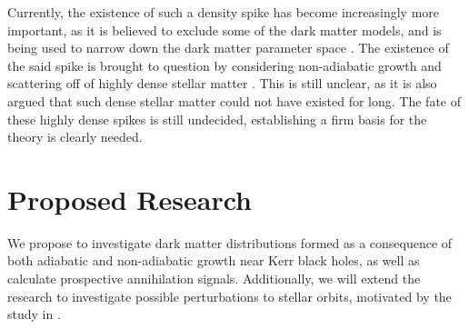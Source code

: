 \documentclass[12pt]{article}
\begin{document}


Currently, the existence of such a density spike has become 
increasingly more important, as it  
is believed to exclude some of the dark matter models, and is 
being used to narrow down the dark matter parameter space \citep{gondolo2000dmsearch,bertone2001dmsearch,fields2014galactic}. 
The existence of the said spike is brought to question by 
considering non-adiabatic growth and scattering off of highly dense 
stellar matter \citep{ullio2001spike_criticism, merritt2002merger_criticism}. 
This is still unclear, as it is also 
argued that such dense stellar matter could not have existed 
for long. %
The 
fate of these highly dense spikes is still undecided, establishing a firm basis for the 
theory is clearly needed.

\section{Proposed Research}


We propose to investigate dark matter distributions formed 
as a consequence of both adiabatic and non-adiabatic growth near Kerr black holes, 
as well as calculate prospective annihilation signals. 
Additionally, we will extend the research to investigate possible perturbations to 
stellar orbits, motivated by the study in \citep{Sadeghian_Ferrer_Will_2013}. 
\end{document}
